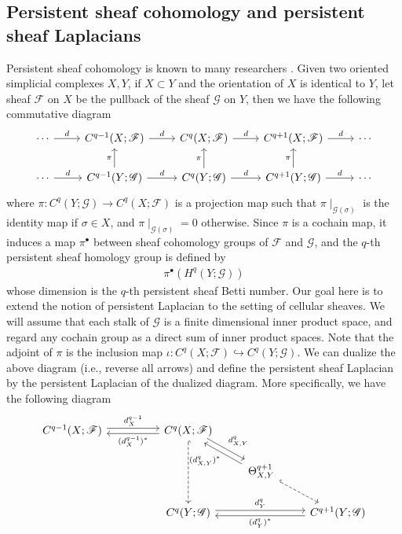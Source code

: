 \documentclass[11pt]{article}
\theoremstyle{definition}
\theoremstyle{definition}
\begin{document}
\subsection{Persistent sheaf cohomology and persistent sheaf Laplacians}

Persistent sheaf cohomology is known to many researchers \cite{michaelrobinsontutorial, russold2022persistent, yegnesh2016persistence}.
Given two oriented simplicial complexes $X,Y$, if $X \subset Y$ and the orientation of $X$ is identical to $Y$, 
let sheaf $\mathscr{F}$ on $X$ be the pullback of the sheaf $\mathscr{G}$ on $Y$,
then we have the following commutative diagram 
\[
    \begin{tikzcd}
        \cdots \arrow[r, "d"]
         & C^{q-1}(X; \mathscr{F}) \arrow[r, "d"] 
          & C^q(X; \mathscr{F}) \arrow[r, "d"] 
           & C^{q+1}(X; \mathscr{F}) \arrow[r, "d"]
            & \cdots\\
        \cdots \arrow[r, "d"]
         & C^{q-1}(Y; \mathscr{G}) \arrow[r, "d"] \arrow[u, "\pi"]  
          & C^q(Y; \mathscr{G})    \arrow[r, "d"] \arrow[u, "\pi"]  
           & C^{q+1}(Y; \mathscr{G}) \arrow[r, "d"] \arrow[u, "\pi"]
            & \cdots 
    \end{tikzcd}
\]
where $\pi: C^{q}(Y; \mathscr{G}) \to C^q(X; \mathscr{F})$ is a projection map such that
$\pi\mid_{\mathscr{G}(\sigma)}$ is the identity map if $\sigma \in X$, and $\pi\mid_{\mathscr{G}(\sigma)} = 0$ otherwise.
Since $\pi$ is a cochain map, it induces a map $\pi^{\bullet}$ between sheaf cohomology groups of $\mathscr{F}$ and $\mathscr{G}$,
and the $q$-th persistent sheaf homology group is defined by
\begin{align*}
    \pi^{\bullet} (H^q(Y; \mathscr{G}))
\end{align*}
whose dimension is the $q$-th persistent sheaf Betti number.
Our goal here is to extend the notion of persistent Laplacian to the setting of cellular sheaves.
We will assume that each stalk of $\mathscr{G}$ is a finite dimensional inner product space, 
and regard any cochain group as a direct sum of inner product spaces. 
Note that the adjoint of $\pi$ is the inclusion map $\iota: C^q(X;\mathscr{F}) \hookrightarrow C^q(Y;\mathscr{G})$. 
We can dualize the above diagram (i.e., reverse all arrows) and define the persistent sheaf Laplacian by the persistent Laplacian of the dualized diagram.
More specifically, we have the following diagram
\[
\begin{tikzcd}
    C^{q-1}(X; \mathscr{F}) \arrow[rr, "d^{q-1}_X", shift left] %
     &
      & C^{q}(X; \mathscr{F}) \arrow[ll, "(d^{q-1}_X)^{\ast}", shift left] \arrow[rd, "d^{q}_{X,Y}", shift left] \arrow[dd, hook, dashed]
       & 
        & \\
     & 
      &
       & \Theta^{q+1}_{X,Y} \arrow[lu, "(d^{q}_{X,Y})^{\ast}", shift left] \arrow[rd, hook, dashed]
        & \\
     &
      & C^q(Y; \mathscr{G}) \arrow[rr, "d^q_Y", shift left]
       & 
        & C^{q+1}(Y; \mathscr{G}) \arrow[ll, "(d^q_Y)^{\ast}", shift left]
\end{tikzcd}
\]
\end{document}
